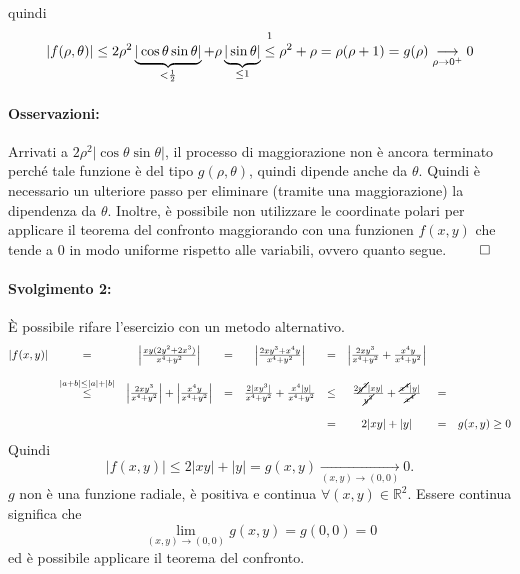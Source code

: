 \begin{example}
	\noindent quindi
	\begin{equation*}
		|f(\rho, \theta)|\leq 2\rho^2\underbrace{|\cos\theta\sin\theta|}_{<\frac{1}{2}} + \rho \underbrace{|\sin\theta|}_{\leq 1}\overset{\footnotemark}{\leq} \rho^2+\rho = \rho(\rho+1) = g(\rho)\underset{\rho\rightarrow0^+}{\longrightarrow}0
	\end{equation*}
	
	\paragraph{Osservazioni:} Arrivati a $2\rho^2|\cos\theta\sin\theta|$, il processo di maggiorazione non è ancora terminato perché tale funzione è del tipo $g(\rho,\theta)$, quindi dipende anche da $\theta$. Quindi è necessario un ulteriore passo per eliminare (tramite una maggiorazione) la dipendenza da $\theta$. Inoltre, è possibile non utilizzare le coordinate polari per applicare il teorema del confronto maggiorando con una funzionen $f(x,y)$ che tende a 0 in modo uniforme rispetto alle variabili, ovvero quanto segue. $\qed$
	
	\paragraph{Svolgimento 2:} È possibile rifare l'esercizio con un metodo alternativo.
	\begin{equation*}
		\begin{matrix}
			|f(x,y)| &=& \left| \frac{xy(2y^2 + 2 x^3)}{x^4+y^2}\right| &=& \left| \frac{2xy^3 + x^4y}{x^4+y^2}\right| &=& \left|\frac{2xy^3}{x^4+y^2} + \frac{x^4y}{x^4+y^2}\right|\\\\ &\overset{|a+b|\leq|a|+|b|}{\leq}& \left|\frac{2xy^3}{x^4+y^2}\right| + \left| \frac{x^4y}{x^4+y^2}\right| &=& \frac{2|xy^3|}{x^4+y^2} + \frac{x^4|y|}{x^4+y^2} &\leq& \frac{2\cancel{y^2}|xy|}{\cancel{y^2}} +  \frac{\cancel{x^4}|y|}{\cancel{x^4}} &=&\\\\
			&&&&&=& 2|xy|+|y| &=& g(x,y) \geq 0
		\end{matrix}
	\end{equation*}
	Quindi
	\begin{equation*}
		|f(x,y)| \leq  2|xy|+|y| = g(x,y)\underset{(x,y)\rightarrow(0,0)}{\longrightarrow} 0.
	\end{equation*}
	$g$ non è una funzione radiale, è positiva e continua $\forall(x,y)\in\mathbb{R}^2$. Essere continua significa che
	\begin{equation*}
		\lim\limits_{(x,y)\rightarrow(0,0)} g(x,y)=g(0,0)=0
	\end{equation*}
	ed è possibile applicare il teorema del confronto.
\end{example}

